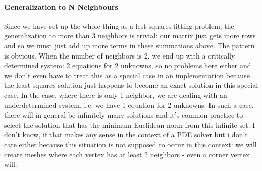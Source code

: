 \paragraph{Generalization to N Neighbours}
Since we have set up the whole thing as a lest-squares fitting problem, the generalization to more than 3 neighbors is trivial: our matrix just gets more rows and so we must just add up more terms in these summations above. The pattern is obvious. When the number of neighbors is 2, we end up with a critically determined system: 2 equations for 2 unknowns, so no problems here either and we don't even have to treat this as a special case in an implementation because the least-squares solution just happens to become an exact solution in this special case. In the case, where there is only 1 neighbor, we are dealing with an underdetermined system, i.e. we have 1 equation for 2 unknowns. In such a case, there will in general be infinitely many solutions and it's common practice to select the solution that has the minimum Euclidean norm from this infinite set. I don't know, if that makes any sense in the context of a PDE solver but i don't care either because this situation is not supposed to occur in this context: we will create meshes where each vertex has at least 2 neighbors - even a corner vertex will.


